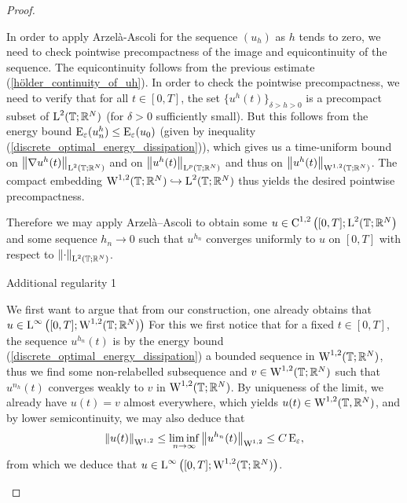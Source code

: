 \begin{proof}
\begin{description}[wide=0pt]
		In order to apply Arzelà-Ascoli for the sequence $ (u_{ h } ) $ as $ h $ tends to zero, we need to check pointwise precompactness of the image and equicontinuity of the sequence. 
		The equicontinuity follows from the previous estimate (\ref{hölder_continuity_of_uh}).
		In order to check the pointwise precompactness, we need to verify that for all $ t \in [ 0 , T ] $, the set
		$ \{ u^{ h } ( t ) \}_{ \delta > h > 0 } $ is a precompact subset of $ \operatorname{L}^{ 2 } ( \operatorname{\mathbb{T}} ; \mathbb{ R }^{ N } ) $ (for $ \delta > 0 $ sufficiently small). 
		But this follows from the energy bound $ \operatorname{E}_{ \varepsilon } ( u_{ n }^{ h } ) \leq \operatorname{E}_{ \varepsilon } ( u_{ 0 } ) $ (given by inequality (\ref{discrete_optimal_energy_dissipation})), which gives us a time-uniform bound on $ \norm{ \nabla u^{ h }( t ) }_{\operatorname{L}^{ 2 }( \operatorname{\mathbb{T}}; \mathbb{ R }^{ N } ) } $ and on $ \norm{ u^{ h } ( t )}_{ \operatorname{L}^{ p } ( \operatorname{\mathbb{T}}; \mathbb{ R }^{ N } ) } $ and thus on $ \norm{ u^{ h } ( t )}_{ \operatorname{W}^{ 1 , 2 } ( \operatorname{\mathbb{T}}; \mathbb{ R }^{ N } ) } $. The compact embedding
		$ \operatorname{W}^{ 1 , 2 } ( \operatorname{\mathbb{T}} ; \mathbb{ R }^{ N } ) \hookrightarrow \operatorname{L}^{ 2 } ( \operatorname{\mathbb{T}}; \mathbb{ R }^{ N } ) $ thus yields the desired pointwise precompactness.
		
		Therefore we may apply Arzelà--Ascoli to obtain some $ u \in \operatorname{C}^{ 1 , 2 } \left( [ 0, T ] ; \operatorname{L}^{ 2 } ( \operatorname{\mathbb{T}} ; \mathbb{ R }^{ N } \right) $ and some  sequence $ h_{ n } \to 0 $ such that
		$ u^{ h_{ n } } $ converges uniformly to $ u $ on $ [ 0 , T ] $ with respect to $ \norm{ \cdot }_{ \operatorname{L}^{ 2 } ( \operatorname{\mathbb{T}} ; \mathbb{ R }^{ N } ) } $.
		
		\item[Step 6:] Additional regularity 1
		
		We first want to argue that from our construction, one already obtains that $ u \in \operatorname{L}^{ \infty } \left( [ 0 , T ] ; \operatorname{W}^{ 1, 2 } ( \operatorname{\mathbb{T}} ; \mathbb{ R }^{ N } ) \right) $
		For this we first notice that for a fixed $ t \in [ 0 , T ] $, the sequence $ u^{ h_{ n } } ( t ) $ is by the energy bound (\ref{discrete_optimal_energy_dissipation}) a bounded sequence in $ \operatorname{W}^{ 1 , 2 } ( \operatorname{\mathbb{T}} ; \mathbb{ R }^{ N } ) $, thus we find some non-relabelled subsequence and $ v \in \operatorname{W}^{ 1 , 2 } ( \operatorname{\mathbb{T}} ; \mathbb{ R }^{ N } ) $ such that $ u^{ n_{h } } ( t ) $ converges weakly to $ v $ in $ \operatorname{W}^{ 1 , 2 } ( \operatorname{\mathbb{T}} ; \mathbb{ R }^{ N } ) $. By uniqueness of the limit, we already have $ u ( t ) = v $ almost everywhere, which yields $ u ( t ) \in \operatorname{W}^{ 1 , 2 } ( \operatorname{\mathbb{T}}, \mathbb{ R }^{ N } ) $, and by lower semicontinuity, we may also deduce that
		\begin{equation*}
			\norm{ u ( t ) }_{ \operatorname{W}^{ 1 , 2 } }
			\leq
			\liminf_{ n \to \infty }
			\norm{ u^{ h_{ n } } ( t ) }_{ \operatorname{W}^{ 1 , 2 } }
			\leq
			C \operatorname{E}_{ \varepsilon },
		\end{equation*}
		from which we deduce that $ u \in \operatorname{L}^{ \infty } \left( [ 0 , T ] ; \operatorname{W}^{ 1 , 2 } ( \operatorname{\mathbb{T}} ; \mathbb{ R }^{ N } ) \right) $.	
		

\end{description}
\end{proof}
